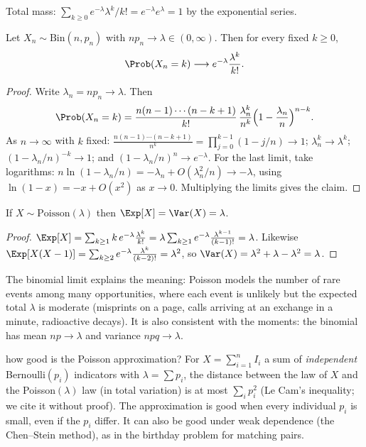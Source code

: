 Total mass: $\sum_{k\ge0}e^{-\lambda}\lambda^k/k!=e^{-\lambda}e^\lambda=1$ by the
exponential series.

\begin{theorem}\label{thm:poissonlimit}
Let $X_n\sim\mathrm{Bin}(n,p_n)$ with $np_n\to\lambda\in(0,\infty)$. Then for
every fixed $k\ge0$,
\[
\Prob(X_n=k)\longrightarrow e^{-\lambda}\frac{\lambda^k}{k!}.
\]
\end{theorem}
\begin{proof}
Write $\lambda_n=np_n\to\lambda$. Then
\[
\Prob(X_n=k)=\frac{n(n-1)\cdots(n-k+1)}{k!}\,\frac{\lambda_n^k}{n^k}
\Bigl(1-\frac{\lambda_n}n\Bigr)^{n-k}.
\]
As $n\to\infty$ with $k$ fixed: $\frac{n(n-1)\cdots(n-k+1)}{n^k}=
\prod_{j=0}^{k-1}(1-j/n)\to1$; $\lambda_n^k\to\lambda^k$;
$(1-\lambda_n/n)^{-k}\to1$; and $(1-\lambda_n/n)^n\to e^{-\lambda}$. For the last
limit, take logarithms: $n\ln(1-\lambda_n/n)=-\lambda_n+O(\lambda_n^2/n)\to-\lambda$,
using $\ln(1-x)=-x+O(x^2)$ as $x\to0$. Multiplying the limits gives the claim.
\end{proof}

\begin{theorem}\label{thm:poissmoments}
If $X\sim\mathrm{Poisson}(\lambda)$ then $\Exp[X]=\Var(X)=\lambda$.
\end{theorem}
\begin{proof}
$\Exp[X]=\sum_{k\ge1}k\,e^{-\lambda}\frac{\lambda^k}{k!}=\lambda\sum_{k\ge1}
e^{-\lambda}\frac{\lambda^{k-1}}{(k-1)!}=\lambda$. Likewise
$\Exp[X(X-1)]=\sum_{k\ge2}e^{-\lambda}\frac{\lambda^k}{(k-2)!}=\lambda^2$, so
$\Var(X)=\lambda^2+\lambda-\lambda^2=\lambda$.
\end{proof}

The binomial limit explains the meaning: Poisson models the number of rare events
among many opportunities, where each event is unlikely but the expected total
$\lambda$ is moderate (misprints on a page, calls arriving at an exchange in a
minute, radioactive decays). It is also consistent with the moments: the binomial
has mean $np\to\lambda$ and variance $npq\to\lambda$.

\begin{nuance}{how good is the Poisson approximation?}
For $X=\sum_{i=1}^nI_i$ a sum of \emph{independent} Bernoulli$(p_i)$ indicators
with $\lambda=\sum p_i$, the distance between the law of $X$ and the
Poisson$(\lambda)$ law (in total variation) is at most $\sum_ip_i^2$ (Le Cam's
inequality; we cite it without proof). The approximation is good when every
individual $p_i$ is small, even if the $p_i$ differ. It can also be good under
weak dependence (the Chen--Stein method), as in the birthday problem for matching
pairs.
\end{nuance}

